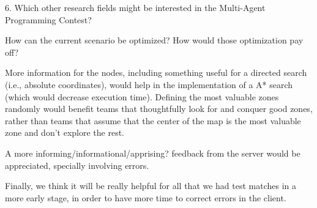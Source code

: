 \begin{question}
6. Which other research fields might be interested in the Multi-Agent
Programming Contest?
\end{question}

\begin{question}
How can the current scenario be optimized? How would those optimization pay
off?
\end{question}

    More information for the nodes, including something useful for a directed search (i.e., absolute coordinates), would help in
    the implementation of a A* search (which would decrease execution time). Defining the most valuable zones randomly would benefit teams that thoughtfully look for and conquer good zones, rather than teams that assume that the center of the map is the most valuable zone and don't explore the rest.

    A more informing/informational/apprising? feedback from the server would
    be appreciated, specially involving errors.

    Finally, we think it will be really helpful for all that we had test
    matches in a more early stage, in order to have more time to correct
    errors in the client.
